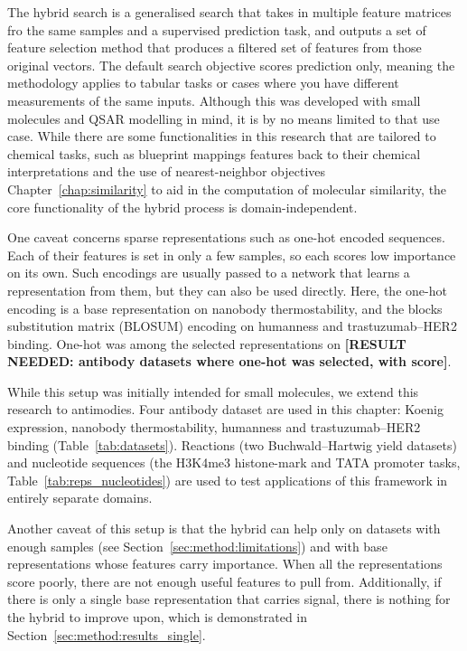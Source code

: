 The hybrid search is a generalised search that takes in multiple feature matrices fro the same samples and a supervised prediction task, and outputs a set of feature selection method that produces a filtered set of features from those original vectors. The default search objective scores prediction only, meaning the methodology applies to tabular tasks or cases where you have different measurements of the same inputs. Although this was developed with small molecules and QSAR modelling in mind, it is by no means limited to that use case. While there are some functionalities in this research that are tailored to chemical tasks, such as blueprint mappings features back to their chemical interpretations and the use of nearest-neighbor objectives Chapter~\ref{chap:similarity} to aid in the computation of molecular similarity, the core functionality of the hybrid process is domain-independent.

One caveat concerns sparse representations such as one-hot encoded sequences. Each of their features is set in only a few samples, so each scores low importance on its own. Such encodings are usually passed to a network that learns a representation from them, but they can also be used directly. Here, the one-hot encoding is a base representation on nanobody thermostability, and the blocks substitution matrix (BLOSUM) encoding on humanness and trastuzumab--HER2 binding. One-hot was among the selected representations on \textbf{[RESULT NEEDED: antibody datasets where one-hot was selected, with score]}.

While this setup was initially intended for small molecules, we extend this research to antimodies. Four antibody dataset are used in this chapter: Koenig expression, nanobody thermostability, humanness and trastuzumab--HER2 binding (Table~\ref{tab:datasets}). Reactions (two Buchwald--Hartwig yield datasets) and nucleotide sequences (the H3K4me3 histone-mark and TATA promoter tasks, Table~\ref{tab:reps_nucleotides}) are used to test applications of this framework in entirely separate domains.  

Another caveat of this setup is that the hybrid can help only on datasets with enough samples (see Section~\ref{sec:method:limitations}) and with base representations whose features carry importance. When all the representations score poorly, there are not enough useful features to pull from. Additionally, if there is only a single base representation that carries signal, there is nothing for the hybrid to improve upon, which is demonstrated in Section~\ref{sec:method:results_single}.


